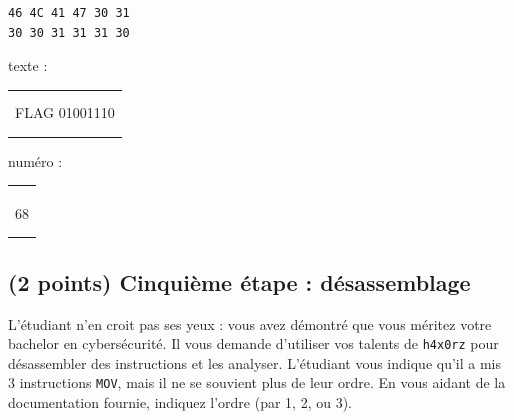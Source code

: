 \documentclass[11pt,a4paper]{article}
\begin{document}
\begin{table}[ht!]
  \centering
  \begin{minipage}{0.3\textwidth}
    \centering

\begin{lstlisting}[style=algorithmique]
46 4C 41 47 30 31
30 30 31 31 31 30
\end{lstlisting}

  \end{minipage}
  \hfillx
  \begin{minipage}{0.3\textwidth}
    \centering

texte :

\medskip

\begin{tabular}{ | m{2.5cm} | }
\hline
 \\ \\ %
FLAG 01001110
 \\ \\ \\
\hline
\end{tabular}

  \end{minipage}
  \hfillx
  \begin{minipage}{0.3\textwidth}
    \centering

numéro :

\medskip

\begin{tabular}{ | m{2.5cm} | }
\hline
 \\ \\ \\
68
 \\ \\ \\
\hline
\end{tabular}

  \end{minipage}
\end{table}


\subsection{(2 points) Cinquième étape : désassemblage }

L'étudiant n'en croit pas ses yeux : vous avez démontré que vous méritez votre bachelor en cybersécurité.
Il vous demande d'utiliser vos talents de \texttt{h4x0rz} pour désassembler des instructions et les analyser.
L'étudiant vous indique qu'il a mis 3 instructions \texttt{MOV}, mais il ne se souvient plus de leur ordre.
En vous aidant de la documentation fournie, indiquez l'ordre (par 1, 2, ou 3).
\end{document}
